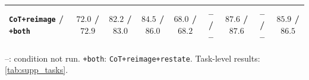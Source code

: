 \begin{table}[t]
\begin{tabular}{@{}lcccccccc@{}}
\texttt{CoT+reimage} / \texttt{+both} & $72.0$ / $72.9$ & $82.2$ / $83.0$ & $84.5$ / $86.0$ & $68.0$ / $68.2$ & -- / -- & $87.6$ / $87.6$ & -- / -- & $85.9$ / $86.5$ \\
\bottomrule
\end{tabular}
\par\vspace{1pt}
\footnotesize{\raggedright --: condition not run. \texttt{+both}: \texttt{CoT+reimage+restate}. Task-level results: \cref{tab:supp_tasks}.\par}
\end{table}
